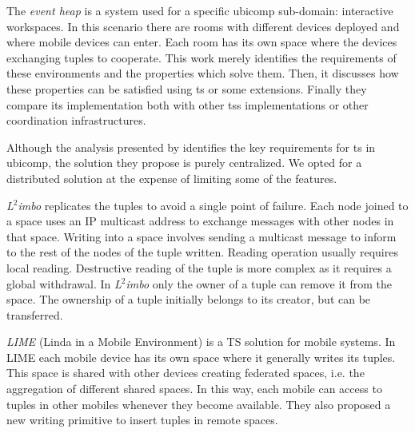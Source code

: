 The \emph{event heap} \citep{johanson_extending_2004} is a system used for a specific \ac{ubicomp} sub-domain: interactive workspaces.
In this scenario there are rooms with different devices deployed and where mobile devices can enter.
Each room has its own space where the devices exchanging tuples to cooperate.
This work merely identifies the requirements of these environments and the properties which solve them.
Then, it discusses how these properties can be satisfied using \ac{ts} or some extensions.
Finally they compare its implementation both with other \acp{ts} implementations or other coordination infrastructures. %

Although the analysis presented by \citeauthor{johanson_extending_2004} identifies the key requirements for \ac{ts} in \ac{ubicomp},
the solution they propose is purely centralized.
We opted for a distributed solution at the expense of limiting some of the features.


\emph{L$^2$imbo} \citep{davies_l2imbo:_1998,friday_experiences_1999} replicates the tuples to avoid a single point of failure.
Each node joined to a space uses an IP multicast address to exchange messages with other nodes in that space.
Writing into a space involves sending a multicast message to inform to the rest of the nodes of the tuple written.
Reading operation usually requires local reading.
Destructive reading of the tuple is more complex as it requires a global withdrawal.
In \emph{L$^2$imbo} only the owner of a tuple can remove it from the space.
The ownership of a tuple initially belongs to its creator, but can be transferred. %


\emph{LIME} (Linda in a Mobile Environment) \citep{picco_lime:_1999} is a TS solution for mobile systems.
In LIME each mobile device has its own space where it generally writes its tuples.
This space is shared with other devices creating federated spaces, i.e. the aggregation of different shared spaces.
In this way, each mobile can access to tuples in other mobiles whenever they become available.
They also proposed a new writing primitive to insert tuples in remote spaces.

